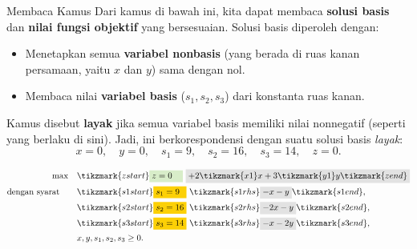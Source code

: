 \begin{remark}{Membaca Kamus}{}
Dari kamus di bawah ini, kita dapat membaca \textbf{solusi basis} dan \textbf{nilai fungsi objektif} yang bersesuaian. Solusi basis diperoleh dengan:
\begin{itemize}
    \item Menetapkan semua \textbf{variabel nonbasis} (yang berada di ruas kanan persamaan, yaitu \(x\) dan \(y\)) sama dengan nol.
    \item Membaca nilai \textbf{variabel basis} (\(s_1, s_2, s_3\)) dari konstanta ruas kanan.
\end{itemize}

Kamus disebut \textbf{layak} jika semua variabel basis memiliki nilai nonnegatif (seperti yang berlaku di sini). Jadi, ini berkorespondensi dengan suatu solusi basis \emph{layak}:
\[
x = 0, \quad y = 0, \quad s_1 = 9, \quad s_2 = 16, \quad s_3 = 14, \quad z = 0.
\]
\vspace{1cm}

\[
\begin{aligned}
\max \quad 
& \tikzmark{zstart} \text{\colorbox{green!20!white}{$z = 0$\phantom{$1_1$}}} ~ \text{\colorbox{gray!20!white}{$+ 2\tikzmark{x1}x + 3\tikzmark{y1}y \tikzmark{zend}$}} \\
\st \quad 
& \tikzmark{s1start} \text{\colorbox{yellow}{$s_1 = 9$\phantom{1}}} ~ \tikzmark{s1rhs}\text{\colorbox{gray!20!white}{$- x - y$}} \tikzmark{s1end}, \\
& \tikzmark{s2start} \text{\colorbox{yellow}{$s_2 = 16$}} ~ \tikzmark{s2rhs} \text{\colorbox{gray!20!white}{$- 2x - y$}} \tikzmark{s2end}, \\
& \tikzmark{s3start} \text{\colorbox{yellow}{$s_3 = 14$}} ~ \tikzmark{s3rhs} \text{\colorbox{gray!20!white}{$- x - 2y$}} \tikzmark{s3end}, \\
& x, y, s_1, s_2, s_3 \ge 0.
\end{aligned}
\]

\end{remark}


